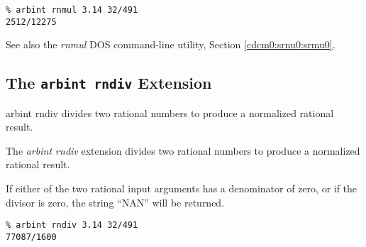 \begin{tclcommandsampleinvocations}
\begin{scriptsize}
\begin{verbatim}
% arbint rnmul 3.14 32/491
2512/12275
\end{verbatim}
\end{scriptsize}
\end{tclcommandsampleinvocations}

\begin{tclcommandseealso}
See also the \emph{rnmul} DOS command-line utility, 
Section \ref{cdcm0:srnu0:srmu0}.
\end{tclcommandseealso}


\subsection{The \texttt{arbint rndiv} Extension}
\label{cxtn0:srne0:srdv0}

\begin{tclcommandname}{arbint rndiv}%
divides two rational numbers to produce a normalized rational result.
\end{tclcommandname}

\begin{tclcommandsynopsis}
\end{tclcommandsynopsis}

\begin{tclcommanddescription}
The \emph{arbint rndiv} extension divides two rational numbers to produce a 
normalized rational result.

If either of the two rational input arguments has a denominator of zero, or
if the divisor is zero,
the string ``NAN'' will be returned.
\end{tclcommanddescription}

\begin{tclcommandsampleinvocations}
\begin{scriptsize}
\begin{verbatim}
% arbint rndiv 3.14 32/491
77087/1600
\end{verbatim}
\end{scriptsize}
\end{tclcommandsampleinvocations}

